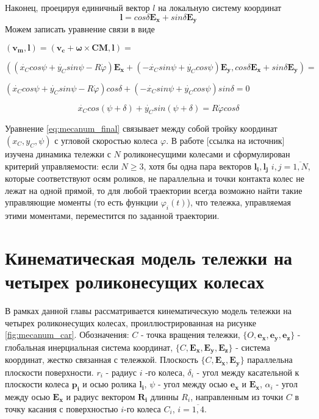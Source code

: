 \documentclass[oneside,final,14pt]{extreport}
\newcommand{\cmmnt}[1]{\ignorespaces}
\newcommand{\bs}{\boldsymbol}
\begin{document}
 Наконец, проецируя единичный вектор $l$ на локальную систему координат 
\begin{equation}
\bs{l}
=
cos\delta
\bs{E_{x}}
+
sin\delta
\bs{E_{y}}
\end{equation}
Можем записать уравнение связи в виде
\begin{flushleft}
$
(
\bs{v_{m}}
,
\bs{l}
)
=
(
\bs{v_{c}}
+
\bs{\omega}
\times
\bs{CM}
,
\bs{l}
)
=
$

$
(
(
\dot{x_{C}}
cos\psi
+
\dot{y_{C}}
sin\psi
-R\dot{\varphi}
)
\bs{E_{x}}
+
(
-\dot{x_{C}}
sin\psi
+
\dot{y_{C}}
cos\psi
)
\bs{E_{y}}
,
cos\delta
\bs{E_{x}}
+
sin\delta
\bs{E_{y}}
)
=
$

$
(
\dot{x_{C}}
cos\psi
+
\dot{y_{C}}
sin\psi
-R\dot{\varphi}
)
cos\delta
+
(
-\dot{x_{C}}
sin\psi
+
\dot{y_{C}}
cos\psi
)
sin\delta
=
0
$
\end{flushleft}
\begin{equation}
\label{eq:mecanum_final}
\dot{x_{C}}
cos(\psi+\delta)
+
\dot{y_{C}}
sin(\psi+\delta)
=
R\dot{\varphi}
cos\delta
\end{equation}

Уравнение \ref{eq:mecanum_final} связывает между собой тройку координат $(x_{C},y_{C},\psi)$ с угловой скоростью колеса $\varphi$. В работе [ссылка на источник] изучена динамика тележки с $N$ роликонесущими колесами и сформулирован критерий управляемости:
если $N \geq 3$, хотя бы одна пара векторов  $\bs{l_{i}}, \bs{l_{j}}$ $i,j=\overline{1,N}$, которые соответствуют осям роликов, не параллельна и точки контакта колес не лежат на одной прямой, то для любой траектории всегда возможно найти такие управляющие моменты (то есть функции $\varphi_{i}(t)$), что тележка, управляемая этими моментами, переместится по заданной траектории.

\chapter{Кинематическая модель тележки на четырех роликонесущих колесах}
В рамках данной главы рассматривается кинематическую модель тележки на четырех роликонесущих колесах, проиллюстрированная на рисунке  \ref{fig:mecanum_car}. Обозначения: $C$ - точка вращения тележки, $\{O,\bs{e_{x}},\bs{e_{y}},\bs{e_{z}}\}$ - глобальная инерциальная система координат, $\{C,\bs{E_{x}},\bs{E_{y}},\bs{E_{z}}\}$ - система координат, жестко связанная с тележкой. Плоскость $\{C,\bs{E_{x}},\bs{E_{y}}\}$ параллельна плоскости поверхности.  $r_{i}$ - радиус $i$ -го колеса, $\delta_{i}$ - угол между касательной к плоскости колеса $\bs{p_{i}}$ и осью ролика $\bs{l_{i}}$\cmmnt{, $\delta_{i} = \widehat{p_{i} l_{i}}$ }, $\psi$ - угол между осью $\bs{e_{x}}$ и $\bs{E_{x}}$\cmmnt{, $\psi$ = $\widehat{e_{x}E{x}}$}, $\alpha_{i}$ - угол между осью $\bs{E_{x}}$ и радиус вектором $\bs{R_{i}}$ длинны $R_{i}$, направленным из точки $C$ в точку касания с поверхностью $i$-го колеса $C_{i}$\cmmnt{,$\alpha_{i} = \widehat{E_{x}\overrightarrow{C C_{i}}}$}, $i=\overline{1,4}$. 
\end{document}
